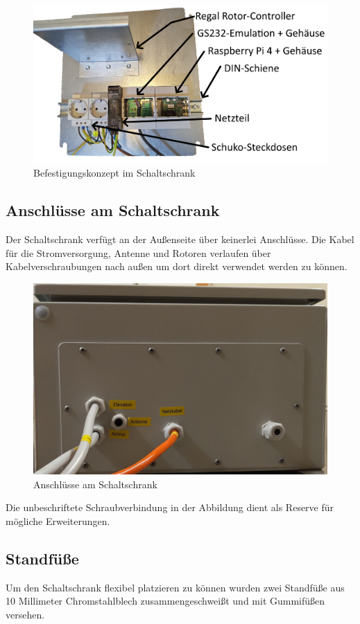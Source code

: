 \begin{figure}[H]
	\centering
	\includegraphics[width=0.7\linewidth]{../ref/Schaltschrank_Befestigung.jpg}
	\caption{Befestigungskonzept im Schaltschrank}
	\label{fig:schaltschrankbefestigung}
\end{figure}

\subsection{Anschlüsse am Schaltschrank}
Der Schaltschrank verfügt an der Außenseite über keinerlei Anschlüsse. Die Kabel für die Stromversorgung, Antenne und Rotoren verlaufen über Kabelverschraubungen nach außen um dort direkt verwendet werden zu können. 

\begin{figure}[H]
	\centering
	\includegraphics[width=0.7\linewidth]{../ref/Schaltschrank_Anschluss.jpeg}
	\caption{Anschlüsse am Schaltschrank}
	\label{fig:schaltschrankanschluesse}
\end{figure}

Die unbeschriftete Schraubverbindung in der Abbildung dient als Reserve für mögliche Erweiterungen.

\subsection{Standfüße}
Um den Schaltschrank flexibel platzieren zu können wurden zwei Standfüße aus 10 Millimeter Chromstahlblech zusammengeschweißt und mit Gummifüßen versehen. 

